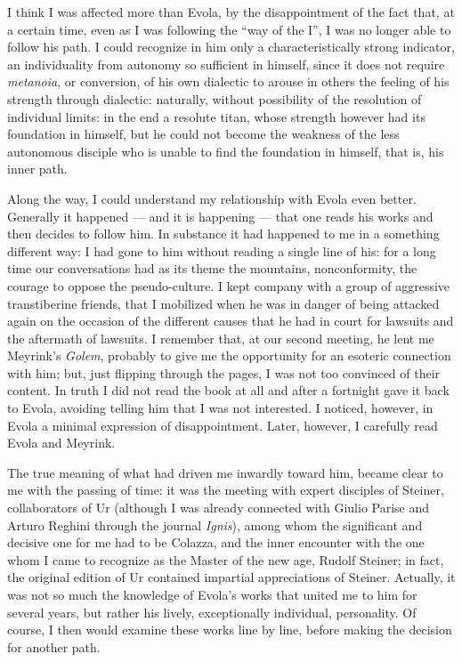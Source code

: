 I think I was affected more than Evola, by the disappointment of the fact that, at a certain time, even as I was following the ``way of the I'', I was no longer able to follow his path. I could recognize in him only a characteristically strong indicator, an individuality from autonomy so sufficient in himself, since it does not require \emph{metanoia}, or conversion, of his own dialectic to arouse in others the feeling of his strength through dialectic: naturally, without possibility of the resolution of individual limits: in the end a resolute titan, whose strength however had its foundation in himself, but he could not become the weakness of the less autonomous disciple who is unable to find the foundation in himself, that is, his inner path.

Along the way, I could understand my relationship with Evola even better. Generally it happened --- and it is happening --- that one reads his works and then decides to follow him. In substance it had happened to me in a something different way: I had gone to him without reading a single line of his: for a long time our conversations had as its theme the mountains, nonconformity, the courage to oppose the pseudo-culture. I kept company with a group of aggressive transtiberine friends, that I mobilized when he was in danger of being attacked again on the occasion of the different causes that he had in court for lawsuits and the aftermath of lawsuits. I remember that, at our second meeting, he lent me Meyrink's \emph{Golem}, probably to give me the opportunity for an esoteric connection with him; but, just flipping through the pages, I was not too convinced of their content. In truth I did not read the book at all and after a fortnight gave it back to Evola, avoiding telling him that I was not interested. I noticed, however, in Evola a minimal expression of disappointment. Later, however, I carefully read Evola and Meyrink.

The true meaning of what had driven me inwardly toward him, became clear to me with the passing of time: it was the meeting with expert disciples of Steiner, collaborators of Ur (although I was already connected with Giulio Parise and Arturo Reghini through the journal \emph{Ignis}), among whom the significant and decisive one for me had to be Colazza, and the inner encounter with the one whom I came to recognize as the Master of the new age, Rudolf Steiner; in fact, the original edition of Ur contained impartial appreciations of Steiner. Actually, it was not so much the knowledge of Evola's works that united me to him for several years, but rather his lively, exceptionally individual, personality. Of course, I then would examine these works line by line, before making the decision for another path.

